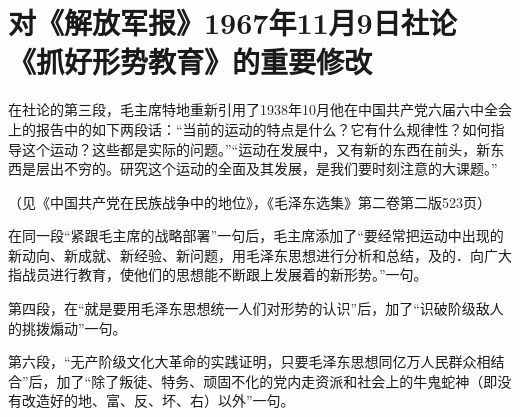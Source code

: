 \section[对《解放军报》1967年11月9日社论《抓好形势教育》的重要修改（一九六七年十一月）]{对《解放军报》1967年11月9日社论《抓好形势教育》的重要修改}


在社论的第三段，毛主席特地重新引用了1938年10月他在中国共产党六届六中全会上的报告中的如下两段话：“当前的运动的特点是什么？它有什么规律性？如何指导这个运动？这些都是实际的问题。”“运动在发展中，又有新的东西在前头，新东西是层出不穷的。研究这个运动的全面及其发展，是我们要时刻注意的大课题。”

（见《中国共产党在民族战争中的地位》，《毛泽东选集》第二卷第二版523页）

在同一段“紧跟毛主席的战略部署”一句后，毛主席添加了“要经常把运动中出现的新动向、新成就、新经验、新问题，用毛泽东思想进行分析和总结，及的．向广大指战员进行教育，使他们的思想能不断跟上发展着的新形势。”一句。

第四段，在“就是要用毛泽东思想统一人们对形势的认识”后，加了“识破阶级敌人的挑拨煽动”一句。

第六段，“无产阶级文化大革命的实践证明，只要毛泽东思想同亿万人民群众相结合”后，加了“除了叛徒、特务、顽固不化的党内走资派和社会上的牛鬼蛇神（即没有改造好的地、富、反、坏、右）以外”一句。

